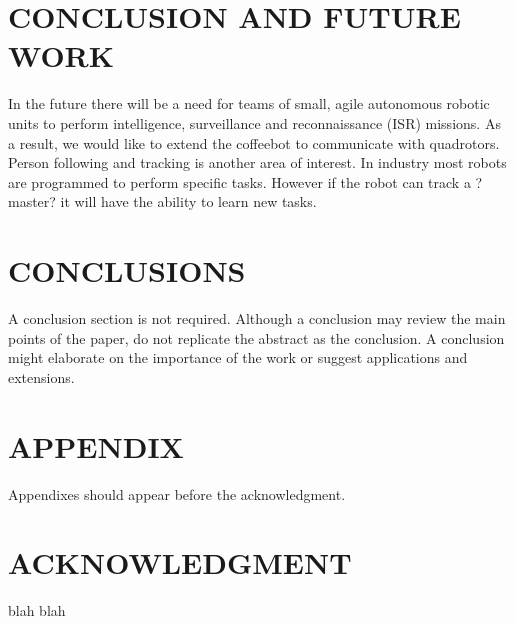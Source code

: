 \documentclass[letterpaper, 10 pt, conference]{ieeeconf}  %
\begin{document}
\section{CONCLUSION AND FUTURE WORK}

In the future there will be a need for teams of small, agile autonomous robotic units to perform intelligence, surveillance and reconnaissance (ISR) missions. As a result, we would like to extend the coffeebot to communicate with quadrotors. Person following and tracking is another area of interest. In industry most robots are programmed to perform specific tasks. However if the robot can track a ?master? it will have the ability to learn new tasks.


\section{CONCLUSIONS}

A conclusion section is not required. Although a conclusion may review the main points of the paper, do not replicate the abstract as the conclusion. A conclusion might elaborate on the importance of the work or suggest applications and extensions. 

\addtolength{\textheight}{-12cm}   %





\section*{APPENDIX}

Appendixes should appear before the acknowledgment.

\section*{ACKNOWLEDGMENT}

blah blah





\end{document}
